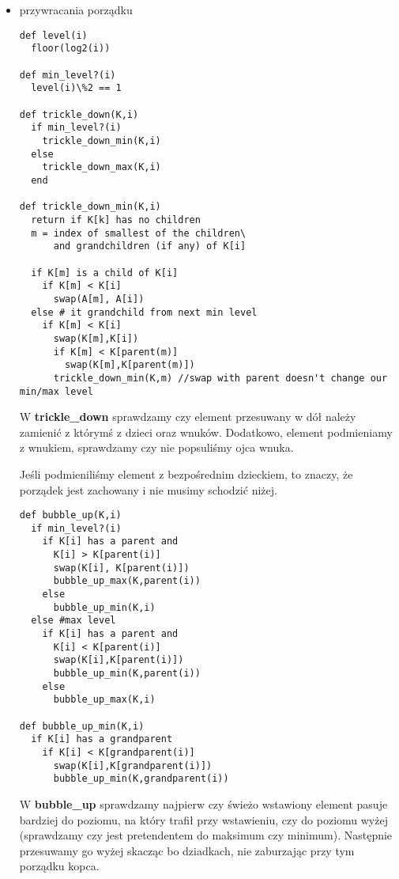 \section{}%
\begin{itemize}
\item{przywracania porządku}
\begin{verbatim}
def level(i)
  floor(log2(i))

def min_level?(i)
  level(i)\%2 == 1

def trickle_down(K,i)
  if min_level?(i)
    trickle_down_min(K,i)
  else
    trickle_down_max(K,i)
  end

def trickle_down_min(K,i)
  return if K[k] has no children
  m = index of smallest of the children\
      and grandchildren (if any) of K[i]
  
  if K[m] is a child of K[i]
    if K[m] < K[i]
      swap(A[m], A[i])
  else # it grandchild from next min level
    if K[m] < K[i]
      swap(K[m],K[i])
      if K[m] < K[parent(m)]
        swap(K[m],K[parent(m)])
      trickle_down_min(K,m) //swap with parent doesn't change our min/max level
\end{verbatim}

W \textbf{trickle\_down} sprawdzamy czy element przesuwany w dół należy zamienić z którymś z dzieci oraz wnuków. Dodatkowo, element podmieniamy z wnukiem, sprawdzamy czy nie popsuliśmy ojca wnuka.

Jeśli podmieniliśmy element z bezpośrednim dzieckiem, to znaczy, że porządek jest zachowany i nie musimy schodzić niżej.

\begin{verbatim}
def bubble_up(K,i)
  if min_level?(i)
    if K[i] has a parent and
      K[i] > K[parent(i)]
      swap(K[i], K[parent(i)])
      bubble_up_max(K,parent(i))
    else
      bubble_up_min(K,i)
  else #max level
    if K[i] has a parent and
      K[i] < K[parent(i)]
      swap(K[i],K[parent(i)])
      bubble_up_min(K,parent(i))
    else
      bubble_up_max(K,i)

def bubble_up_min(K,i)
  if K[i] has a grandparent
    if K[i] < K[grandparent(i)]
      swap(K[i],K[grandparent(i)])
      bubble_up_min(K,grandparent(i))
\end{verbatim}
W \textbf{bubble\_up} sprawdzamy najpierw czy świeżo wstawiony element pasuje bardziej do poziomu, na który trafił przy wstawieniu, czy do poziomu wyżej (sprawdzamy czy jest pretendentem do maksimum czy minimum). Następnie przesuwamy go wyżej skacząc bo dziadkach, nie zaburzając przy tym porządku kopca.



\end{itemize}
